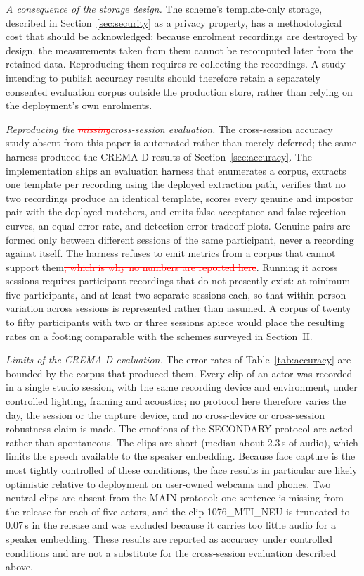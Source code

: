 \documentclass[10pt,journal,compsoc]{IEEEtran}
\begin{document}
{\emph{A consequence of the storage design.} The scheme's template-only storage, described in Section~\ref{sec:security} as a privacy property, has a methodological cost that should be acknowledged: because enrolment recordings are destroyed by design, the measurements taken from them cannot be recomputed later from the retained data. Reproducing them requires re-collecting the recordings. A study intending to publish accuracy results should therefore retain a separately consented evaluation corpus outside the production store, rather than relying on the deployment's own enrolments.

\emph{Reproducing the \textcolor{red}{\sout{missing}}\textcolor{revpink}{cross-session} evaluation.} The \textcolor{revpink}{cross-session} accuracy study absent from this paper is automated rather than merely deferred\textcolor{revpink}{; the same harness produced the CREMA-D results of Section~\ref{sec:accuracy}}. The implementation ships an evaluation harness that enumerates a corpus, extracts one template per recording using the deployed extraction path, verifies that no two recordings produce an identical template, scores every genuine and impostor pair with the deployed matchers, and emits false-acceptance and false-rejection curves, an equal error rate, and detection-error-tradeoff plots. Genuine pairs are formed only between different sessions of the same participant, never a recording against itself. The harness refuses to emit metrics from a corpus that cannot support them\textcolor{red}{\sout{, which is why no numbers are reported here}}. Running it \textcolor{revpink}{across sessions} requires participant recordings that do not presently exist: at minimum five participants, and at least two separate sessions each, so that within-person variation across sessions is represented rather than assumed. A corpus of twenty to fifty participants with two or three sessions apiece would place the resulting rates on a footing comparable with the schemes surveyed in Section~II.

\textcolor{revpink}{\emph{Limits of the CREMA-D evaluation.} The error rates of Table~\ref{tab:accuracy} are bounded by the corpus that produced them. Every clip of an actor was recorded in a single studio session, with the same recording device and environment, under controlled lighting, framing and acoustics; no protocol here therefore varies the day, the session or the capture device, and no cross-device or cross-session robustness claim is made. The emotions of the SECONDARY protocol are acted rather than spontaneous. The clips are short (median about 2.3\,s of audio), which limits the speech available to the speaker embedding. Because face capture is the most tightly controlled of these conditions, the face results in particular are likely optimistic relative to deployment on user-owned webcams and phones. Two neutral clips are absent from the MAIN protocol: one sentence is missing from the release for each of five actors, and the clip 1076\_MTI\_NEU is truncated to 0.07\,s in the release and was excluded because it carries too little audio for a speaker embedding. These results are reported as accuracy under controlled conditions and are not a substitute for the cross-session evaluation described above.}

}
\end{document}
